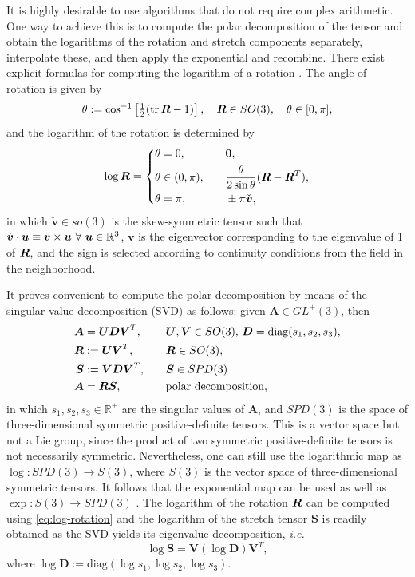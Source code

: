 \documentclass[12pt]{article}
\newcommand{\mbs}[1]{\boldsymbol{#1}}
\newcommand{\mbb}[1]{\mathbb{#1}}
\def\bA{{\mbs{A}}} \def\bB{{\mbs{B}}} \def\bC{{\mbs{C}}}
\def\bD{{\mbs{D}}} \def\bE{{\mbs{E}}} \def\bF{{\mbs{F}}}
\def\bS{{\mbs{S}}} \def\bT{{\mbs{T}}} \def\bU{{\mbs{U}}}
\def\bV{{\mbs{V}}} \def\bW{{\mbs{W}}} \def\bX{{\mbs{X}}}
\def\bv{{\mbs{v}}} \def\bw{{\mbs{w}}} \def\bx{{\mbs{x}}}
\DeclareMathOperator{\tr}{tr}
\begin{document}
It is highly desirable to use algorithms that do not require complex arithmetic.
One way to achieve this is to compute the polar decomposition of the tensor and
obtain the logarithms of the rotation and stretch components separately,
interpolate these, and then apply the exponential and recombine. There exist
explicit formulas for computing the logarithm of a rotation
\citep{Park.Ravani:1997}. The angle of rotation is given by
\begin{equation}
  \theta := \cos^{-1} \left[  \tfrac{1}{2} (\tr \bR - 1) \right],
  \quad
  \bR \in SO(3),
  \quad
  \theta \in [0, \pi],
\end{equation}
and the logarithm of the rotation is determined by
\begin{align}
  \log \bR =
  \left\{ 
    \begin{aligned}
      & \theta = 0, & \quad & \mathbf{0},
      \\
      & \theta \in (0, \pi), & \quad &
      \frac{\theta}{2 \sin \theta} (\bR - \bR^T),
      \\
      & \theta = \pi, & \quad & \pm \pi \check{\bv},
    \end{aligned}
  \right. \label{eq:log-rotation}
\end{align}
in which $\check{\bv} \in so(3)$ is the skew-symmetric tensor such
that $\check{\bv} \cdot \bu \equiv \bv \times \bu \ \forall \ \bu \in
\mbb{R}^3$, $\bv$ is the eigenvector corresponding to the eigenvalue
of 1 of $\bR$, and the sign is selected according to continuity
conditions from the field in the neighborhood.

It proves convenient to compute the polar decomposition by means of
the singular value decomposition (SVD) as follows: given $\bA \in
GL^+(3)$, then
\begin{align}
  \bA & = \bU \bD \bV^T, & \quad & \bU, \bV \in SO(3), \,
  \bD = \text{diag}(s_1,s_2,s_3), \label{eq:SVD-polar-1}
  \\
  \bR & := \bU \bV^T, & \quad & \bR \in SO(3),
  \\
  \bS & := \bV \bD \bV^T, & \quad & \bS \in SPD(3)
  \\
  \bA & = \bR \bS, & \quad
  & \text{polar decomposition}, \label{eq:SVD-polar-4}
\end{align}
in which $s_1,s_2,s_3 \in \mbb{R}^+$ are the singular values of $\bA$,
and $SPD(3)$ is the space of three-dimensional symmetric positive-definite
tensors. This is a vector space but not a Lie group, since
the product of two symmetric positive-definite tensors is not necessarily
symmetric. Nevertheless, one can still use the logarithmic map as
$\log: SPD(3) \rightarrow S(3)$, where $S(3)$ is the vector space of
three-dimensional symmetric tensors. It follows that the exponential
map can be used as well as $\exp: S(3) \rightarrow SPD(3)$
\citep{Gallier:2011}. The logarithm of the rotation $\bR$ can be
computed using \eqref{eq:log-rotation} and the logarithm of the
stretch tensor $\bS$ is readily obtained as the SVD yields its
eigenvalue decomposition, \emph{i.e.}
\begin{equation}
  \log \bS = \bV (\log \bD) \bV^T,
  \label{eq:log-stretch}
\end{equation}
where
$\log \bD := \text{diag}(\log s_1, \log s_2, \log s_3)$.
\end{document}
